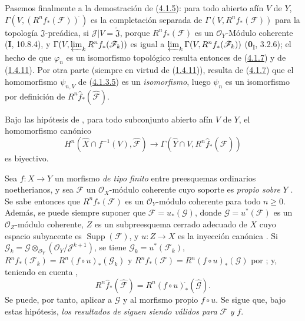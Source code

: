 \begin{env}[4.1.8]
\label{III.4.1.8-fr}
Pasemos finalmente a la demostración de (\hyperref[III.4.1.5-fr]{4.1.5}): para todo abierto afín $V$ de $Y$,
$\Gamma(V,(R^nf_*(\mathcal F))^{\widehat{\,}})$
es la completación separada de
$\Gamma(V,R^nf_*(\mathcal F))$ para la topología
$\mathfrak J$-preádica, si
$\mathcal J|V=\widetilde{\mathfrak J}$, porque
$R^nf_*(\mathcal F)$ es un $\mathcal O_Y$-Módulo coherente (\textbf{I}, 10.8.4),
y $\Gamma(V,\varprojlim_kR^nf_*(\mathcal F_k))$ es igual a
$\varprojlim_k\Gamma(V,R^nf_*(\mathcal F_k))$
(\textbf{0}\textsubscript{I}, 3.2.6); el hecho de que $\varphi_n$ es un isomorfismo topológico resulta entonces de (\hyperref[III.4.1.7-fr]{4.1.7}) y de (\hyperref[III.1.4.11-fr]{1.4.11}). Por otra parte (siempre en virtud de (\hyperref[III.1.4.11-fr]{1.4.11})), resulta de (\hyperref[III.4.1.7-fr]{4.1.7}) que el homomorfismo $\psi_{n,V}$ de
(\hyperref[III.4.1.3.5-fr]{4.1.3.5}) es un \emph{isomorfismo}, luego $\psi_n$
es un isomorfismo por definición de
$R^n\widehat f_*(\widehat{\mathcal F})$.
\end{env}

\begin{corollary}[4.1.9]
\label{III.4.1.9}
\label{III.4.1.9-fr}
Bajo las hipótesis de \textup{}, para todo subconjunto abierto
afín $V$ de $Y$, el homomorfismo canónico
\[
H^n(\widehat X\cap f^{-1}(V),\widehat{\mathcal F})
\longrightarrow\Gamma(\widehat Y\cap V,
R^n\widehat f_*(\widehat{\mathcal F}))
\]
es biyectivo.
\end{corollary}

\begin{remark}[4.1.10]
\label{III.4.1.10}
\label{III.4.1.10-fr}
Sea $f:X\to Y$ un morfismo \emph{de tipo finito} entre preesquemas ordinarios
noetherianos, y sea $\mathcal F$ un $\mathcal O_X$-módulo coherente cuyo
soporte es \emph{propio sobre} $Y$ .
Se sabe entonces  que $R^nf_*(\mathcal F)$ es un
$\mathcal O_Y$-módulo coherente para todo $n\geq0$. Además, se puede
siempre suponer que $\mathcal F=u_*(\mathcal G)$, donde
$\mathcal G=u^*(\mathcal F)$ es un $\mathcal O_Z$-módulo coherente, $Z$ es un
subpreesquema cerrado adecuado de $X$ cuyo espacio subyacente es
$\operatorname{Supp}(\mathcal F)$, y $u:Z\to X$ es la inyección canónica
.
Si
$\mathcal G_k=\mathcal G\otimes_{\mathcal O_Y}
(\mathcal O_Y/\mathcal J^{k+1})$,
se tiene $\mathcal G_k=u^*(\mathcal F_k)$,
$R^nf_*(\mathcal F_k)=R^n(f\circ u)_*(\mathcal G_k)$ y
$R^nf_*(\mathcal F)=R^n(f\circ u)_*(\mathcal G)$
por ; y, teniendo en cuenta ,
\[
R^n\widehat f_*(\widehat{\mathcal F})
=R^n(f\circ u)^{\widehat{\,}}_*(\widehat{\mathcal G}).
\]
Se puede, por tanto, aplicar  a $\mathcal G$ y al morfismo
propio $f\circ u$.
Se sigue que, bajo estas hipótesis, \emph{los resultados de}
 \emph{siguen siendo válidos para} $\mathcal F$ \emph{y} $f$.
\end{remark}


